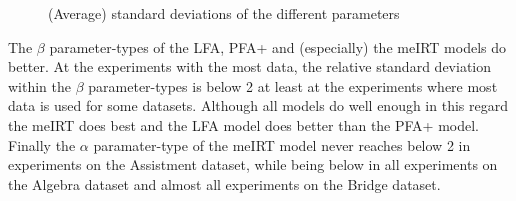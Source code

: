 \documentclass{scrartcl}
\begin{document}
\begin{figure}[h]
\centering
{}
\hspace{0mm}
\caption{(Average) standard deviations of the different parameters}
\label{fig:parvarz}
\end{figure}

The $\beta$ parameter-types of the LFA, PFA+ and (especially) the meIRT models do better. At the experiments with the most data, the relative standard deviation within the $\beta$ parameter-types is below 2 at least at the experiments where most data is used for some datasets. Although all models do well enough in this regard the meIRT does best and the LFA model does better than the PFA+ model. Finally the $\alpha$ paramater-type of the meIRT model never reaches below 2 in experiments on the Assistment dataset, while being below in all experiments on the Algebra dataset and almost all experiments on the Bridge dataset.  
\end{document}
